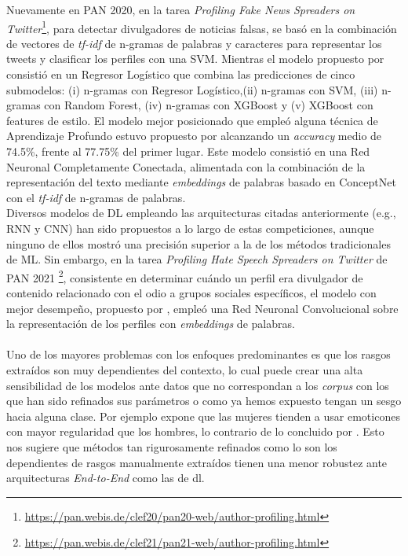  Nuevamente en PAN 2020, en la tarea \textit{Profiling Fake News Spreaders on Twitter}\footnote{\url{https://pan.webis.de/clef20/pan20-web/author-profiling.html}}, para detectar divulgadores de noticias falsas, \citep{pizarro:2020} se basó en la combinación de vectores de \textit{tf-idf} de n-gramas de palabras y caracteres para representar los tweets y clasificar los perfiles con una SVM. Mientras el modelo propuesto por \citep{buda:2020} consistió en un Regresor Logístico que combina las predicciones de cinco submodelos: (i) n-gramas con Regresor Logístico,(ii) n-gramas con SVM, (iii) n-gramas con Random Forest, (iv) n-gramas con XGBoost y (v) XGBoost con features de estilo. El modelo mejor posicionado que empleó alguna técnica de Aprendizaje Profundo estuvo propuesto por \citep{giglou:2020} alcanzando un \textit{accuracy} medio de 74.5\%, frente al 77.75\% del primer lugar. Este modelo consistió en una Red Neuronal Completamente Conectada, alimentada con la combinación de la representación del texto mediante \textit{embeddings} de palabras basado en ConceptNet con el \textit{tf-idf} de n-gramas de palabras.
 \\
Diversos modelos de DL empleando las arquitecturas citadas anteriormente (e.g., RNN y CNN) han sido propuestos a lo largo de estas competiciones, aunque ninguno de ellos mostró una precisión superior a la de los métodos tradicionales de ML. Sin embargo, en la tarea \textit{Profiling Hate Speech Spreaders on Twitter} de PAN 2021 \footnote{\url{https://pan.webis.de/clef21/pan21-web/author-profiling.html}}, consistente en determinar cuándo un perfil era divulgador de contenido relacionado con el odio a grupos sociales específicos, el modelo con mejor desempeño, propuesto por \citep{sinno:2021}, empleó una Red Neuronal Convolucional sobre la representación de los perfiles con \textit{embeddings} de palabras. 
\\\\
Uno de los mayores problemas con los enfoques predominantes es que los rasgos extraídos son muy dependientes del contexto, lo cual puede crear una alta sensibilidad de los modelos ante datos que no correspondan a los \textit{corpus} con los que han sido refinados sus parámetros o como ya hemos expuesto tengan un sesgo hacia alguna clase. Por ejemplo \citep{Newman2008GenderDI} expone que las mujeres tienden a usar emoticones con mayor regularidad que los hombres, lo contrario de lo concluido por \citep{Schwartz2013PersonalityGA}. Esto nos sugiere que métodos tan rigurosamente refinados como lo son los dependientes de rasgos manualmente extraídos tienen una menor robustez ante arquitecturas \textit{End-to-End} como las de \acl{dl}.

